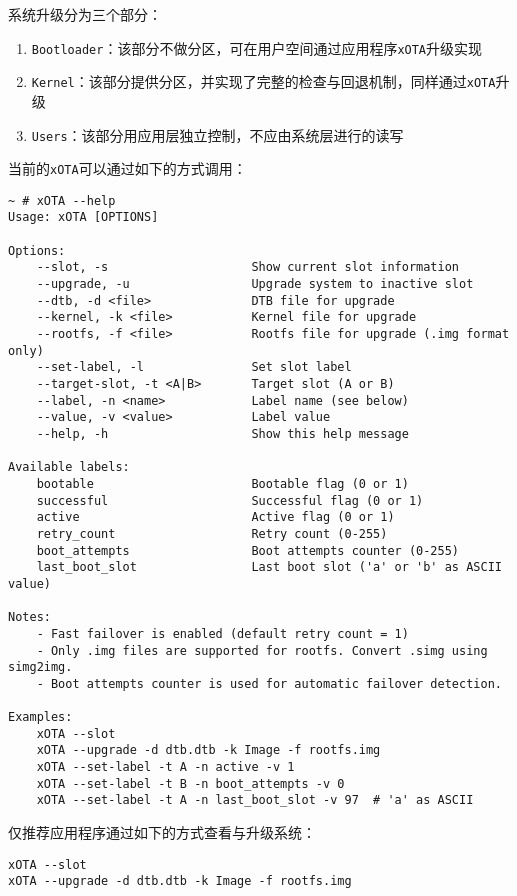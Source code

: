 \documentclass[UTF8]{ctexart}
\newcommand{\code}[1]{\colorbox{gray!10}{\lstinline[style=inlinecode]|#1|}}
\begin{document}
系统升级分为三个部分：

\begin{enumerate}
    \item \code{Bootloader}：该部分不做分区，可在用户空间通过应用程序\code{xOTA}升级实现
    \item \code{Kernel}：该部分提供分区，并实现了完整的检查与回退机制，同样通过\code{xOTA}升级
    \item \code{Users}：该部分用应用层独立控制，不应由系统层进行的读写
\end{enumerate}

当前的\code{xOTA}可以通过如下的方式调用：

\begin{lstlisting}
~ # xOTA --help
Usage: xOTA [OPTIONS]

Options:
    --slot, -s                    Show current slot information
    --upgrade, -u                 Upgrade system to inactive slot
    --dtb, -d <file>              DTB file for upgrade
    --kernel, -k <file>           Kernel file for upgrade
    --rootfs, -f <file>           Rootfs file for upgrade (.img format only)
    --set-label, -l               Set slot label
    --target-slot, -t <A|B>       Target slot (A or B)
    --label, -n <name>            Label name (see below)
    --value, -v <value>           Label value
    --help, -h                    Show this help message

Available labels:
    bootable                      Bootable flag (0 or 1)
    successful                    Successful flag (0 or 1)
    active                        Active flag (0 or 1)
    retry_count                   Retry count (0-255)
    boot_attempts                 Boot attempts counter (0-255)
    last_boot_slot                Last boot slot ('a' or 'b' as ASCII value)

Notes:
    - Fast failover is enabled (default retry count = 1)
    - Only .img files are supported for rootfs. Convert .simg using simg2img.
    - Boot attempts counter is used for automatic failover detection.

Examples:
    xOTA --slot
    xOTA --upgrade -d dtb.dtb -k Image -f rootfs.img
    xOTA --set-label -t A -n active -v 1
    xOTA --set-label -t B -n boot_attempts -v 0
    xOTA --set-label -t A -n last_boot_slot -v 97  # 'a' as ASCII    
\end{lstlisting}

仅推荐应用程序通过如下的方式查看与升级系统：

\begin{lstlisting}
xOTA --slot
xOTA --upgrade -d dtb.dtb -k Image -f rootfs.img
\end{lstlisting}
\end{document}
